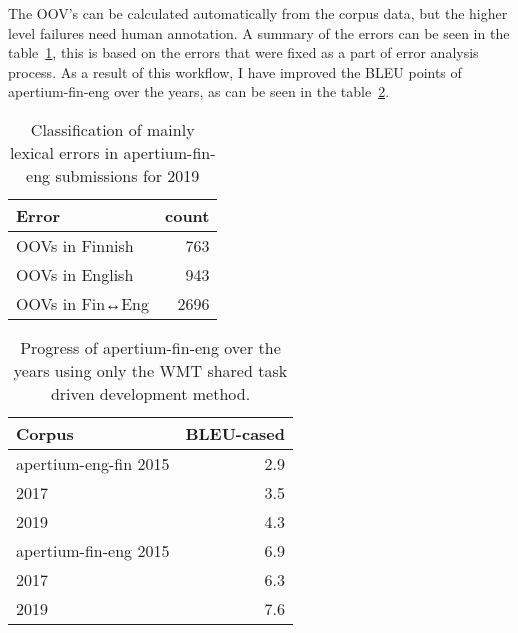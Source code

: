 \documentclass[11pt,a4paper]{article}
\begin{document}
The OOV's can be calculated automatically from the corpus data, but the higher
level failures need human annotation. A summary of the errors can be seen in the
table~\ref{table:errors}, this is based on the errors that were fixed as a part
of error analysis process. As a result of this workflow, I have improved the
BLEU points of apertium-fin-eng over the years, as can be seen in the
table~\ref{table:progress}.

\begin{table}
\begin{center}
    \begin{tabular}{lr}
        \toprule
        Error & count \\
        \midrule
        OOVs in Finnish & 763 \\
        OOVs in English & 943 \\
        OOVs in Fin↔Eng & 2696 \\
        \bottomrule
    \end{tabular}
    \caption{Classification of mainly lexical errors in apertium-fin-eng
    submissions for 2019\label{table:errors}}
\end{center}
\end{table}


\begin{table}
\begin{center}
    \begin{tabular}{lr}
        \toprule
        \bf Corpus & BLEU-cased  \\
        \midrule
        apertium-eng-fin 2015 & 2.9 \\
        \hfill 2017 & 3.5  \\
        \hfill 2019 & 4.3  \\
        \midrule
        apertium-fin-eng 2015 & 6.9\\
        \hfill 2017 & 6.3 \\
        \hfill 2019 & 7.6 \\
        \bottomrule
    \end{tabular}
    \caption{Progress of apertium-fin-eng over the years using only the WMT
    shared task driven development method.\label{table:progress}}
\end{center}
\end{table}
\end{document}
